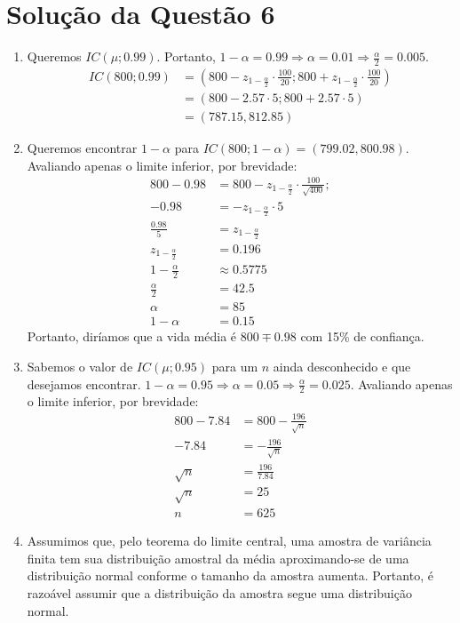 \documentclass[
	12pt,				%
	openright,			%
	oneside,			%
	a4paper,			%
	english,			%
	brazil,				%
	]{abntex2}
\begin{document}
\section{Solução da Questão 6}
\begin{enumerate}[label=\alph*)]
    \item Queremos $IC(\mu;0.99)$. Portanto, $1 - \alpha = 0.99 \Rightarrow \alpha = 0.01 \Rightarrow \frac{\alpha}{2} = 0.005$.
    \begin{align*}
        IC(800;0.99) &= \left(800 - z_{1 - \frac{\alpha}{2}} \cdot \frac{100}{20}; 800 + z_{1 - \frac{\alpha}{2}} \cdot \frac{100}{20}\right)\\
        &= (800 - 2.57 \cdot 5; 800 + 2.57 \cdot 5)\\
        &= (787.15, 812.85)
    \end{align*}

    \item Queremos encontrar $1 - \alpha$ para $IC(800;1 - \alpha) = (799.02, 800.98)$. Avaliando apenas o limite inferior, por brevidade:
    \begin{align*}
        800 - 0.98 &= 800 - z_{1 - \frac{\alpha}{2}} \cdot \frac{100}{\sqrt{400}};\\
        - 0.98 &= - z_{1 - \frac{\alpha}{2}} \cdot 5\\
        \frac{0.98}{5} &= z_{1 - \frac{\alpha}{2}}\\
        z_{1 - \frac{\alpha}{2}} &= 0.196\\
        1 - \frac{\alpha}{2} &\approx 0.5775\\
        \frac{\alpha}{2} &= 42.5\\
        \alpha &= 85\\
        1 - \alpha &= 0.15
    \end{align*}
    Portanto, diríamos que a vida média é $800 \mp 0.98$ com 15\% de confiança. 
    
    \item Sabemos o valor de $IC(\mu;0.95)$ para um $n$ ainda desconhecido e que desejamos encontrar. $1 - \alpha = 0.95 \Rightarrow \alpha = 0.05 \Rightarrow \frac{\alpha}{2} = 0.025$. Avaliando apenas o limite inferior, por brevidade:
    \begin{align*}
        800 - 7.84 &= 800 - \frac{196}{\sqrt{n}}\\
        - 7.84 &= -\frac{196}{\sqrt{n}}\\
        \sqrt{n} &= \frac{196}{7.84}\\
        \sqrt{n} &= 25\\
        n &= 625
    \end{align*}

    \item Assumimos que, pelo teorema do limite central, uma amostra de variância finita tem sua distribuição amostral da média aproximando-se de uma distribuição normal conforme o tamanho da amostra aumenta. Portanto, é razoável assumir que a distribuição da amostra segue uma distribuição normal.
\end{enumerate}
\end{document}
